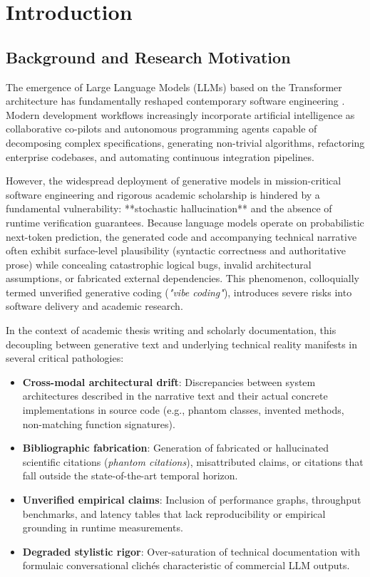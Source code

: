 \chapter{Introduction}
\label{chap:introduction}

\section{Background and Research Motivation}
\label{sec:motivation}

The emergence of Large Language Models (LLMs) based on the Transformer architecture has fundamentally reshaped contemporary software engineering \cite{Jimenez2024SWEbench}. Modern development workflows increasingly incorporate artificial intelligence as collaborative co-pilots and autonomous programming agents capable of decomposing complex specifications, generating non-trivial algorithms, refactoring enterprise codebases, and automating continuous integration pipelines.

However, the widespread deployment of generative models in mission-critical software engineering and rigorous academic scholarship is hindered by a fundamental vulnerability: **stochastic hallucination** and the absence of runtime verification guarantees. Because language models operate on probabilistic next-token prediction, the generated code and accompanying technical narrative often exhibit surface-level plausibility (syntactic correctness and authoritative prose) while concealing catastrophic logical bugs, invalid architectural assumptions, or fabricated external dependencies. This phenomenon, colloquially termed unverified generative coding (\emph{"vibe coding"}), introduces severe risks into software delivery and academic research.

In the context of academic thesis writing and scholarly documentation, this decoupling between generative text and underlying technical reality manifests in several critical pathologies:
\begin{itemize}
    \item \textbf{Cross-modal architectural drift}: Discrepancies between system architectures described in the narrative text and their actual concrete implementations in source code (e.g., phantom classes, invented methods, non-matching function signatures).
    \item \textbf{Bibliographic fabrication}: Generation of fabricated or hallucinated scientific citations (\emph{phantom citations}), misattributed claims, or citations that fall outside the state-of-the-art temporal horizon.
    \item \textbf{Unverified empirical claims}: Inclusion of performance graphs, throughput benchmarks, and latency tables that lack reproducibility or empirical grounding in runtime measurements.
    \item \textbf{Degraded stylistic rigor}: Over-saturation of technical documentation with formulaic conversational clichés characteristic of commercial LLM outputs.
\end{itemize}

